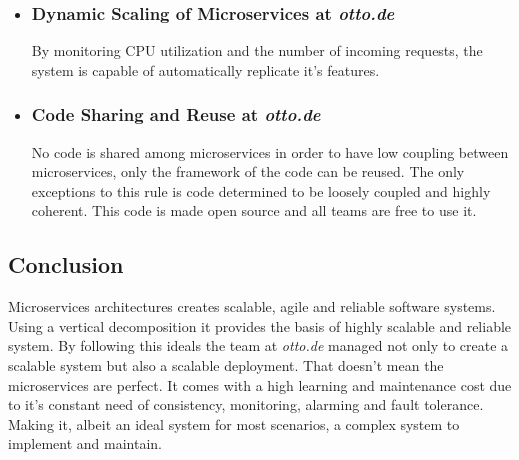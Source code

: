 \documentclass[14pt]{extarticle}
\begin{document}
\begin{itemize}
	\item \subsubsection{Dynamic Scaling of Microservices at \textit{otto.de}}
	By monitoring CPU utilization and the number of incoming requests, the system is capable of automatically replicate it's features.
	\item \subsubsection{Code Sharing and Reuse at \textit{otto.de}}
	No code is shared among microservices in order to have low coupling between microservices, only the framework of the code can be reused. The only exceptions to this rule is code determined to be loosely coupled and highly coherent. This code is made open source and all teams are free to use it.
\end{itemize}

\subsection{Conclusion}

Microservices architectures creates scalable, agile and reliable software systems. Using a vertical decomposition it provides the basis of highly scalable and reliable system. By following this ideals the team at \textit{otto.de} managed not only to create a scalable system but also a scalable deployment. That doesn't mean the microservices are perfect. It comes with a high learning and maintenance cost due to it's constant need of consistency, monitoring, alarming and fault tolerance. Making it, albeit an ideal system for most scenarios, a complex system to implement and maintain.
\end{document}
